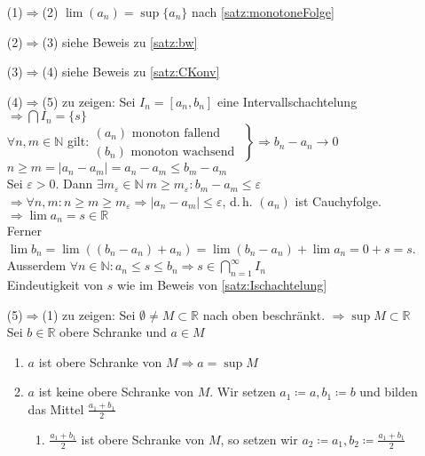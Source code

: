 \documentclass[ngerman,titlepage,twoside, parskip=half*]{scrreprt}
\newcommand*{\N}{\mathbb{N}}
\newcommand*{\R}{\mathbb{R}}
\theoremstyle{plain}
\theoremstyle{definition}
\theoremstyle{remark}
\begin{document}
\begin{itemize}
  \item[(1)$\Rightarrow$(2)] $\lim (a_n)=\sup \{a_n\}$ nach \autoref{satz:monotoneFolge}
  \item[(2)$\Rightarrow$(3)] siehe Beweis zu \autoref{satz:bw}
  \item[(3)$\Rightarrow$(4)] siehe Beweis zu \autoref{satz:CKonv}
  \item[(4)$\Rightarrow$(5)] zu zeigen: Sei $I_n=[a_n,b_n]$ eine Intervallschachtelung $\Rightarrow \bigcap I_n=\{s\}$\\
    $\forall n,m \in \N$ gilt:$\left.
    \begin{array}{lll}
      (a_n) \text{ monoton fallend }\\
      (b_n) \text{ monoton wachsend }
    \end{array}
    \right\} \Rightarrow b_n-a_n\rightarrow 0$\\
    $n\geq m =|a_n-a_m|=a_n-a_m\leq b_m-a_m$\\
    Sei $\varepsilon>0$. Dann $\exists m_{\varepsilon} \in \N\ m\geq m_{\varepsilon}\colon b_m-a_m\leq \varepsilon$\\
    $\Rightarrow \forall n,m \colon n\geq m \geq m_{\varepsilon}\Rightarrow |a_n-a_m|\leq \varepsilon$, d.\,h. $(a_n)$ ist
    Cauchyfolge.\\
    $\Rightarrow \lim a_n = s \in \R$\\
    Ferner $\lim b_n =\lim ((b_n-a_n)+a_n)=\lim (b_n-a_n)+\lim a_n = 0+s=s$. Ausserdem $\forall n \in \N \colon a_n\leq s\leq 
    b_n \Rightarrow s \in \bigcap_{n=1}^{\infty}I_n$\\
    Eindeutigkeit von $s$ wie im Beweis von \autoref{satz:Ischachtelung}
  \item[(5)$\Rightarrow$(1)] zu zeigen: Sei $\emptyset \neq M \subset \R$ nach oben beschränkt. $\Rightarrow \sup M 
    \subset \R$\\
    Sei $b \in \R$ obere Schranke und $a \in M$
    \begin{enumerate}[1. F{a}ll]
      \item $a$ ist obere Schranke von $M \Rightarrow a = \sup M$
      \item $a$ ist keine obere Schranke von $M$. Wir setzen $a_1\coloneqq a,
      b_1\coloneqq b$ und bilden das Mittel $\frac{a_1+b_1}{2}$
      \begin{enumerate}[{2}.1. F{a}ll]
        \item $\frac{a_1+b_1}{2}$ ist obere Schranke von $M$, so setzen wir
	$a_2\coloneqq a_1, b_2\coloneqq\frac{a_1+b_1}{2}$

\end{enumerate}
\end{enumerate}
\end{itemize}
\end{document}
